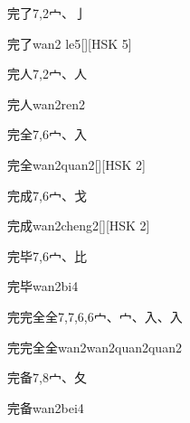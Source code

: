 \begin{Entry}{完了}{7,2}{⼧、⼅}
  \begin{Phonetics}{完了}{wan2 le5}[][HSK 5]
  \end{Phonetics}
\end{Entry}

\begin{Entry}{完人}{7,2}{⼧、⼈}
  \begin{Phonetics}{完人}{wan2ren2}
  \end{Phonetics}
\end{Entry}

\begin{Entry}{完全}{7,6}{⼧、⼊}
  \begin{Phonetics}{完全}{wan2quan2}[][HSK 2]
  \end{Phonetics}
\end{Entry}

\begin{Entry}{完成}{7,6}{⼧、⼽}
  \begin{Phonetics}{完成}{wan2cheng2}[][HSK 2]
  \end{Phonetics}
\end{Entry}

\begin{Entry}{完毕}{7,6}{⼧、⽐}
  \begin{Phonetics}{完毕}{wan2bi4}
  \end{Phonetics}
\end{Entry}

\begin{Entry}{完完全全}{7,7,6,6}{⼧、⼧、⼊、⼊}
  \begin{Phonetics}{完完全全}{wan2wan2quan2quan2}
  \end{Phonetics}
\end{Entry}

\begin{Entry}{完备}{7,8}{⼧、⼡}
  \begin{Phonetics}{完备}{wan2bei4}
  \end{Phonetics}
\end{Entry}

